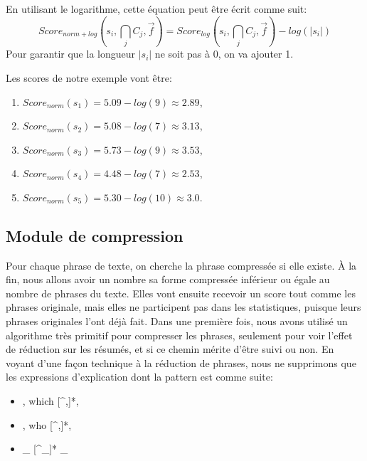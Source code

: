 \documentclass[a4paper,12pt,oneside]{../use/ESIthesis}
\begin{document}
En utilisant le logarithme, cette équation peut être écrit comme suit:
\begin{equation}
\label{eq:score-norm-log}
Score_{norm+log}(s_i , \bigcap_{j} C_j , \overrightarrow{f}) = 
Score_{log}(s_i , \bigcap_{j} C_j , \overrightarrow{f}) - log(|s_i|)
\end{equation}
Pour garantir que la longueur $ |s_i| $ ne soit pas à 0, on va ajouter 1. 

\begin{kexp}
Les scores de notre exemple vont être: 
\begin{enumerate}
\item $ Score_{norm}(s_1) = 5.09 - log(9) \approx 2.89 $,
\item  $ Score_{norm}(s_2) = 5.08 - log(7) \approx 3.13 $, 
\item  $ Score_{norm}(s_3) = 5.73 - log(9) \approx 3.53 $, 
\item  $ Score_{norm}(s_4) = 4.48 - log(7) \approx 2.53 $, 
\item  $ Score_{norm}(s_5) = 5.30 - log(10) \approx 3.0 $.
\end{enumerate}
\end{kexp}

\subsection{Module de compression}

Pour chaque phrase de texte, on cherche la phrase compressée si elle existe. 
À la fin, nous allons avoir un nombre sa forme compressée inférieur ou égale au nombre de phrases du texte. 
Elles vont ensuite recevoir un score tout comme les phrases originale, mais elles ne participent pas dans les statistiques, puisque leurs phrases originales l'ont déjà fait. 
Dans une première fois, nous avons utilisé un algorithme très primitif pour compresser les phrases, seulement pour voir l'effet de réduction sur les résumés, et si ce chemin mérite d'être suivi ou non.
En voyant d'une façon technique à la réduction de phrases, nous ne supprimons que les expressions d'explication dont la pattern est comme suite:
\begin{itemize}
\item , which [\textasciicircum,]*,
\item , who [\textasciicircum,]*,
\item \_ [\textasciicircum\_]* \_
\end{itemize}
\end{document}
